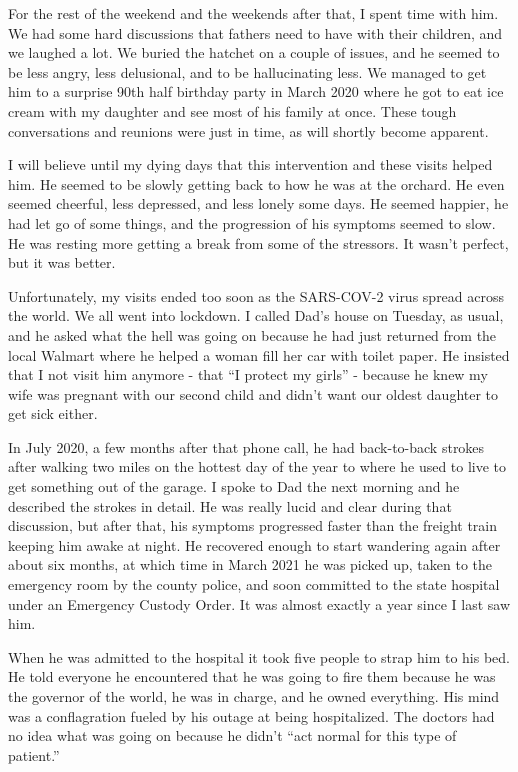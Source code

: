 \documentclass{article}
\begin{document}
For the rest of the weekend and the weekends after that, I spent time with him. We had some hard discussions that fathers need to have with their children, and we laughed a lot. We buried the hatchet on a couple of issues, and he seemed to be less angry, less delusional, and to be hallucinating less. We managed to get him to a surprise 90th half birthday party in March 2020 where he got to eat ice cream with my daughter and see most of his family at once. These tough conversations and reunions were just in time, as will shortly become apparent.

I will believe until my dying days that this intervention and these visits helped him. He seemed to be  slowly getting back to how he was at the orchard. He even seemed cheerful, less depressed, and less lonely some days. He seemed happier, he had let go of some things, and the progression of his symptoms seemed to slow. He was resting more getting a break from some of the stressors. It wasn't perfect, but it was better.

Unfortunately, my visits ended too soon as the SARS-COV-2 virus spread across the world. We all went into lockdown. I called Dad's house on Tuesday, as usual, and he asked what the hell was going on because he had just returned from the local Walmart where he helped a woman fill her car with toilet paper. He insisted that I not visit him anymore - that ``I protect my girls'' - because he knew my wife was pregnant with our second child and didn't want our oldest daughter to get sick either.

In July 2020, a few months after that phone call, he had back-to-back strokes after walking two miles on the hottest day of the year to where he used to live to get something out of the garage. I spoke to Dad the next morning and he described the strokes in detail. He was really lucid and clear during that discussion, but after that, his symptoms progressed faster than the freight train keeping him awake at night. He recovered enough to start wandering again after about six months, at which time in March 2021 he was picked up, taken to the emergency room by the county police, and soon committed to the state hospital under an Emergency Custody Order. It was almost exactly a year since I last saw him. 

When he was admitted to the hospital it took five people to strap him to his bed. He told everyone he encountered that he was going to fire them because he was the governor of the world, he was in charge, and he owned everything. His mind was a conflagration fueled by his outage at being hospitalized. The doctors had no idea what was going on because he didn't ``act normal for this type of patient.''
\end{document}

